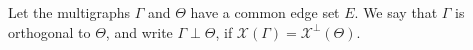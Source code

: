Let the multigraphs $\Gamma$ and $\Theta$ have a common edge set $E$. We say that $\Gamma$ is orthogonal to $\Theta$, and write $\Gamma \perp \Theta$, if $\mathcal{X}(\Gamma) = \mathcal{X}^{\perp}(\Theta)$.
